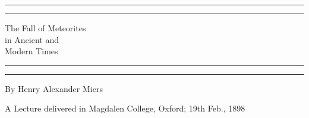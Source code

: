 \documentclass[a4paper, 11pt, oneside]{article}
\begin{document}
\begin{titlepage} %
	\centering %
	\scshape %

	
	\rule{\textwidth}{1.6pt}\vspace*{-\baselineskip}\vspace*{2pt} %
	\rule{\textwidth}{0.4pt} %
	
	\vspace{0.75\baselineskip} %

        {\LARGE The Fall of Meteorites \\ in Ancient and \\ Modern Times} %
	
	\vspace{0.75\baselineskip} %
	
	\rule{\textwidth}{0.4pt}\vspace*{-\baselineskip}\vspace{3.2pt} %
	\rule{\textwidth}{1.6pt} %
	
	\vspace{1\baselineskip} %
	
	
	{\large By Henry Alexander Miers} %
	
	\vspace*{1\baselineskip} %
	
	
	\vspace{1\baselineskip} %

        {\small A Lecture delivered in Magdalen College, Oxford; 19th Feb., 1898}
	
	
		

\end{titlepage}
\end{document}
